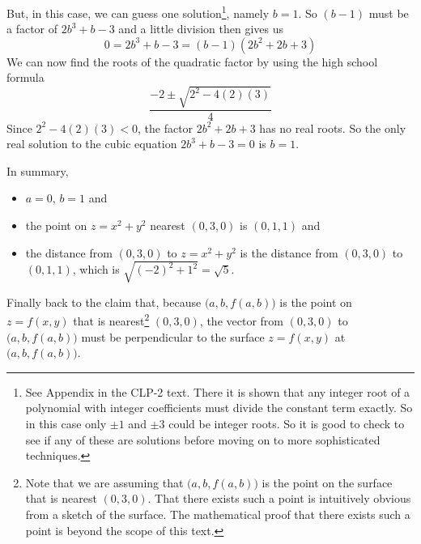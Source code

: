\begin{eg}[Optional]
But, in this case,
we can guess one solution\footnote{See Appendix  in the 
CLP-2 text. There it is shown that any integer root of a polynomial with 
integer coefficients must divide the constant term exactly. So in this case
only $\pm 1$ and $\pm 3$ could be integer roots. So it is good to check to 
see if any of these are solutions before moving on to more sophisticated
techniques.}, namely $b=1$. So $(b-1)$
must be a factor of $2b^3+b-3$ and a little division then gives us
\begin{equation*}
0=2b^3+b-3
=(b-1)(2b^2 +2b  +3)
\end{equation*}
We can now find the roots of the quadratic factor by using
the high school formula
\begin{equation*}
\frac{-2\pm\sqrt{2^2-4(2)(3)}}{4}
\end{equation*}
Since $2^2-4(2)(3)<0$, the factor $2b^2 +2b  +3$ has no real roots. 
So the only real solution to the cubic equation $2b^3+b-3 = 0$
is $b=1$.

In summary, 
\begin{itemize} \itemindent 15pt
\item
$a=0$, $b=1$ and
\item
the point on $z=x^2+y^2$ nearest $(0,3,0)$ is $(0,1,1)$ and 
\item 
the distance from $(0,3,0)$ to $z=x^2+y^2$ is the distance from
$(0,3,0)$ to $(0,1,1)$, which is $\sqrt{(-2)^2+1^2}=\sqrt{5}$. 
\end{itemize}

Finally back to the claim that, because $\big(a,b,f(a,b)\big)$ 
is the point on $z=f(x,y)$ that is nearest\footnote{Note that we are assuming
that $\big(a,b,f(a,b)\big)$ is the point on the surface that is nearest
$(0,3,0)$. That there exists such a point is intuitively obvious from
a sketch of the surface. The mathematical proof that there exists such
a point is beyond the scope of this text.}  $(0,3,0)$, the vector
from $(0,3,0)$ to $\big(a,b,f(a,b)\big)$ must be perpendicular to the
surface $z=f(x,y)$ at $\big(a,b,f(a,b)\big)$.%
\end{eg}
